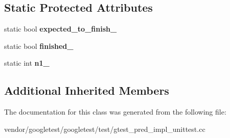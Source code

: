 \subsection*{Static Protected Attributes}
\begin{DoxyCompactItemize}
\item 
\mbox{\label{class_predicate1_test_ad91cfa58e6352d53abacce32df2ef635}} 
static bool {\bfseries expected\+\_\+to\+\_\+finish\+\_\+}
\item 
\mbox{\label{class_predicate1_test_a6d45fb2d1f01a5c8baf28f60039c244e}} 
static bool {\bfseries finished\+\_\+}
\item 
\mbox{\label{class_predicate1_test_a528d9f7f618b17802962a3824eea11e3}} 
static int {\bfseries n1\+\_\+}
\end{DoxyCompactItemize}
\subsection*{Additional Inherited Members}


The documentation for this class was generated from the following file\+:\begin{DoxyCompactItemize}
\item 
vendor/googletest/googletest/test/gtest\+\_\+pred\+\_\+impl\+\_\+unittest.\+cc\end{DoxyCompactItemize}

